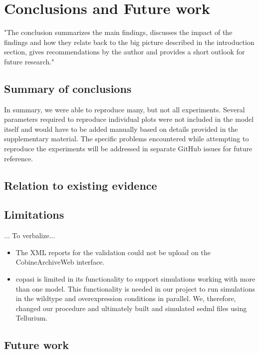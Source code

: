 \section*{Conclusions and Future work}

"The conclusion summarizes the main findings, discusses the impact of the findings and
how they relate back to the big picture described in the introduction section, gives
recommendations by the author and provides a short outlook for future research."

\subsection*{Summary of conclusions}
In summary, we were able to reproduce many, but not all experiments. Several parameters required to reproduce individual plots were not included in the model itself and would have to be added manually based on details provided in the supplementary material. The specific problems encountered while attempting to reproduce the experiments will be addressed in separate GitHub issues for future reference. 

\subsection*{Relation to existing evidence}

\subsection*{Limitations}
... To verbalize...
\begin{itemize}
    \item The XML reports for the validation could not be upload on the CobineArchiveWeb interface.
    \item \ac{copasi} is limited in its functionality to support simulations working with more than one model. This functionality is needed in our project to run simulations in the wildtype and overexpression conditions in parallel. We, therefore, changed our procedure and ultimately built and simulated \ac{sedml} files using Tellurium.
\end{itemize}


\subsection*{Future work}

